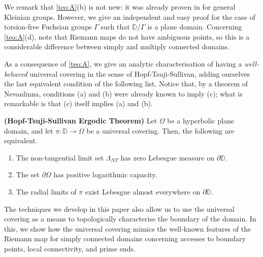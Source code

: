 \documentclass[11pt,a4paper,reqno]{amsart}
\makeatletter
\theoremstyle{plain}
\theoremstyle{definition}
\theoremstyle{plain}
\newcounter{namedthm}
\newenvironment{named}[1]
{\def\namedthmname{#1}%
	\refstepcounter{namedthm}%
	\namedthm\def\@currentlabel{#1}}
{\endnamedthm}
\def\DD{\mathbb{D}}
\makeatother
\begin{document}
We remark that  \ref{teo:A}(b) is not new: it was already proven in \cite{BM74} for general Kleinian groups. However, we give an independent and easy proof  for the case of torsion-free Fuchsian groups $\Gamma$ such that $\DD/\Gamma$ is a plane domain. Concerning \ref{teo:A}(d), note that Riemann maps do not have ambiguous points, so this is a considerable difference between simply and multiply connected domains.

As a consequence of \ref{teo:A}, we give an analytic characterisation of having a \textit{well-behaved} universal covering in the sense of Hopf-Tsuji-Sullivan, adding ourselves the last equivalent condition of the following list. Notice that, by a theorem of Nevanlinna, conditions (a) and (b) were already known to imply (c); what is remarkable is that (c) itself implies (a) and (b).

\begin{named}{Corollary B}\label{teo:B} {\bf (Hopf-Tsuji-Sullivan Ergodic Theorem)}
	Let $\Omega$ be a hyperbolic plane domain, and let $\pi\colon\DD\to\Omega$ be a universal covering. Then, the following are equivalent.
\begin{enumerate}[label={\normalfont (\alph*)}]
	\item The non-tangential limit set $\Lambda_{NT}$ has zero Lebesgue measure on $\partial\DD$.
	\item  The set $\partial\Omega$ has positive logarithmic capacity.
	\item The radial limits of $\pi$ exist Lebesgue almost everywhere on $ \partial\mathbb{D} $.
\end{enumerate}
\end{named}

The techniques we develop in this paper also allow us to use the universal covering as a means to topologically characterise the boundary of the domain. In this, we show how the universal covering mimics the well-known features of the Riemann map for simply connected domains concerning accesses to boundary points, local connectivity, and prime ends.
\end{document}
